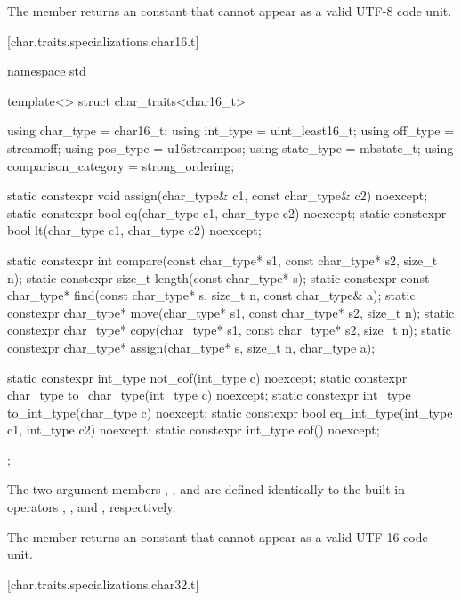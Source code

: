 \pnum
The member  returns an
 constant
that cannot appear as a valid UTF-8 code unit.

[char.traits.specializations.char16.t]{}

%
\begin{codeblock}
namespace std {
  template<> struct char_traits<char16_t> {
    using char_type  = char16_t;
    using int_type   = uint_least16_t;
    using off_type   = streamoff;
    using pos_type   = u16streampos;
    using state_type = mbstate_t;
    using comparison_category = strong_ordering;

    static constexpr void assign(char_type& c1, const char_type& c2) noexcept;
    static constexpr bool eq(char_type c1, char_type c2) noexcept;
    static constexpr bool lt(char_type c1, char_type c2) noexcept;

    static constexpr int compare(const char_type* s1, const char_type* s2, size_t n);
    static constexpr size_t length(const char_type* s);
    static constexpr const char_type* find(const char_type* s, size_t n,
                                           const char_type& a);
    static constexpr char_type* move(char_type* s1, const char_type* s2, size_t n);
    static constexpr char_type* copy(char_type* s1, const char_type* s2, size_t n);
    static constexpr char_type* assign(char_type* s, size_t n, char_type a);

    static constexpr int_type not_eof(int_type c) noexcept;
    static constexpr char_type to_char_type(int_type c) noexcept;
    static constexpr int_type to_int_type(char_type c) noexcept;
    static constexpr bool eq_int_type(int_type c1, int_type c2) noexcept;
    static constexpr int_type eof() noexcept;
  };
}
\end{codeblock}


\pnum
The two-argument members ,
, and  are defined identically to
the built-in operators \tcode{=}, \tcode{==}, and
\tcode{<}, respectively.

\pnum
The member  returns an
 constant that cannot appear
as a valid UTF-16 code unit.

[char.traits.specializations.char32.t]{}

